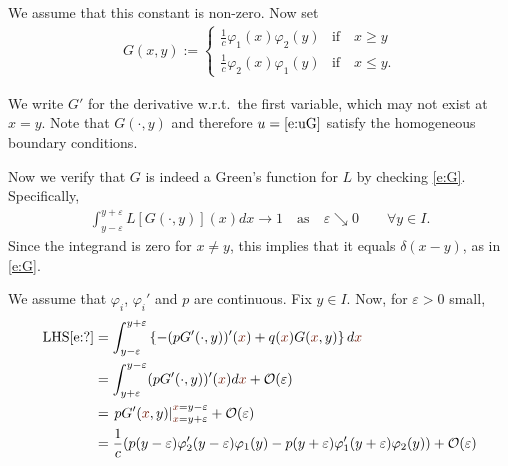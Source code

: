 \documentclass[12pt,a4paper]{article}
\begin{document}
    We assume that this constant is non-zero.
    Now set
    \begin{align}
        G(x, y)
        :=
        \begin{cases}
            \frac1c \varphi_1(x) \varphi_2(y) & \text{if} \quad x \geq y
            \\
            \frac1c \varphi_2(x) \varphi_1(y) & \text{if} \quad x \leq y
            .
        \end{cases}
    \end{align}
        
    We write $G'$ for the derivative 
    w.r.t.~the first variable,
    which may not exist at $x = y$.
    Note that
    $G(\cdot, y)$ and therefore $u = \eqref{e:uG}$
    satisfy the homogeneous boundary conditions.
    
    
    Now we verify that $G$ is indeed a Green's function 
    for $L$ by checking \eqref{e:G}.
    Specifically, 
    \begin{align}
        \label{e:?}
        \int_{y - \varepsilon}^{y + \varepsilon}
        L [G(\cdot, y)](x) dx
        \to
        1
        \quad \text{as} \quad
        \varepsilon \searrow 0
        \qquad
        \forall y \in I
        .
    \end{align}
    Since the integrand is zero for $x \neq y$,
    this implies that it equals $\delta(x - y)$,
    as in \eqref{e:G}.

    
    \newcommand{\x}{{\color{Brown}x}}
    \newcommand{\y}{{y}}
    
    We assume that $\varphi_i$, $\varphi_i'$ and $p$ are continuous.
    Fix $\y \in I$.
    Now, for $\varepsilon > 0$ small,
    \begin{subequations}\begin{align}
        \text{LHS}\eqref{e:?}
        & =
            \int_{\y - \varepsilon}^{\y + \varepsilon}
            \left\{
                -(p G'(\cdot, \y))'(\x) 
                +
                q(\x) G(\x, \y)
            \right\}
            d\x
        \\
        & =
            \int_{\y + \varepsilon}^{\y - \varepsilon}
            (p G'(\cdot, \y))'(\x) 
            d\x
            +
            \mathcal{O}(\varepsilon)
        \\
        & =
            \left.
            p G'(\x, \y)
            \right|_{\x = \y + \varepsilon}^{\x = \y - \varepsilon}
            +
            \mathcal{O}(\varepsilon)
        \\
        & =
            \frac1c
            (
                p(\y - \varepsilon) \varphi_2'(\y - \varepsilon) \varphi_1(\y)
                -
                p(\y + \varepsilon) \varphi_1'(\y + \varepsilon) \varphi_2(\y)
            )
            +
            \mathcal{O}(\varepsilon)
    \end{align}\end{subequations}
    
\end{document}
